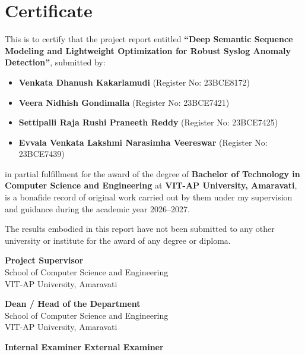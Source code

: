 \chapter*{Certificate}

\noindent This is to certify that the project report entitled \textbf{``Deep Semantic Sequence Modeling and Lightweight Optimization for Robust Syslog Anomaly Detection''}, submitted by:

\begin{itemize}
    \item \textbf{Venkata Dhanush Kakarlamudi} (Register No: 23BCE8172)
    \item \textbf{Veera Nidhish Gondimalla} (Register No: 23BCE7421)
    \item \textbf{Settipalli Raja Rushi Praneeth Reddy} (Register No: 23BCE7425)
    \item \textbf{Evvala Venkata Lakshmi Narasimha Veereswar} (Register No: 23BCE7439)
\end{itemize}

\noindent in partial fulfillment for the award of the degree of \textbf{Bachelor of Technology in Computer Science and Engineering} at \textbf{VIT-AP University, Amaravati}, is a bonafide record of original work carried out by them under my supervision and guidance during the academic year 2026--2027.

\noindent The results embodied in this report have not been submitted to any other university or institute for the award of any degree or diploma.

\vspace{3.0cm}

\noindent
\begin{minipage}{0.45\textwidth}
    \centering
    \textbf{Project Supervisor} \\
    School of Computer Science and Engineering \\
    VIT-AP University, Amaravati
\end{minipage}
\hfill
\begin{minipage}{0.45\textwidth}
    \centering
    \textbf{Dean / Head of the Department} \\
    School of Computer Science and Engineering \\
    VIT-AP University, Amaravati
\end{minipage}

\vspace{2.0cm}

\noindent \textbf{Internal Examiner} \hfill \textbf{External Examiner}

